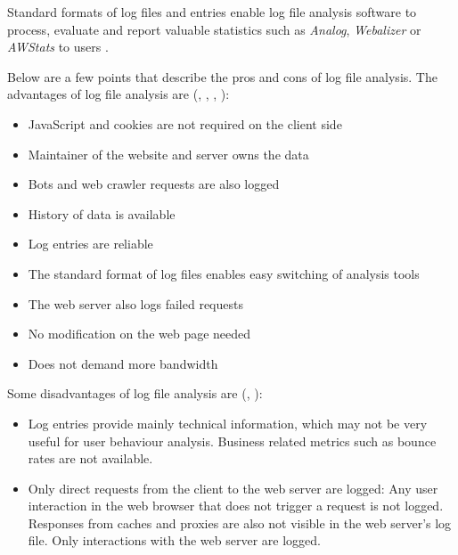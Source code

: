 Standard formats of log files and entries enable log file analysis software to process, evaluate and report valuable statistics such as \textit{Analog}, \textit{Webalizer} or \textit{AWStats} to users \cite{2015Zheng}.


Below are a few points that describe the pros and cons of log file analysis.
The advantages of log file analysis are (\cite{2009Waisberg}, \cite{2011Nakatani}, \cite{2014Singal}, \cite{2015Zheng}):

\begin{itemize}
\item JavaScript and cookies are not required on the client side
\item Maintainer of the website and server owns the data %
\item Bots and web crawler requests are also logged %
\item History of data is available %
\item Log entries are reliable %
\item The standard format of log files enables easy switching of analysis tools %
\item The web server also logs failed requests %
\item No modification on the web page needed %
\item Does not demand more bandwidth %
\end{itemize}


Some disadvantages of log file analysis are (\cite{2011Marek}, \cite{2015Zheng}):

\begin{itemize}
\item Log entries provide mainly technical information, which may not be very useful for user behaviour analysis. Business related metrics such as bounce rates are not available. %
\item Only direct requests from the client to the web server are logged: Any user interaction in the web browser that does not trigger a request is not logged. Responses from caches and proxies are also not visible in the web server's log file. Only interactions with the web server are logged.
\end{itemize}





